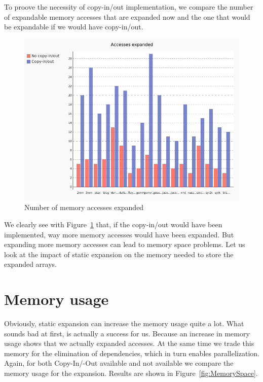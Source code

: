 To proove the necessity of copy-in/out implementation, we compare the number of expandable memory accesses that are expanded now and the one that would be expandable if we would have copy-in/out.

\begin{figure}
\centering
\includegraphics[scale=0.4]{gfx/Evaluation/Numbers.png}
\caption{Number of memory accesses expanded}
\label{fig:Numbers}
\end{figure}

We clearly see with Figure~\ref{fig:Numbers} that, if the copy-in/out would have been implemented, way more memory accesses would have been expanded. But expanding more memory accesses can lead to memory space problems. Let us look at the impact of static expansion on the memory needed to store the expanded arrays.

\section{Memory usage}
Obviously, static expansion can increase the memory usage quite a lot. What sounds bad at first, is actually a success for us. Because an increase in memory usage shows that we actually expanded accesses. At the same time we trade this memory for the elimination of dependencies, which in turn enables parallelization. Again, for both Copy-In/-Out available and not available we compare the memory usage for the expansion. Results are shown in Figure~\ref{fig:MemorySpace}.

